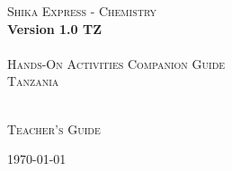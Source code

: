 \begin{titlepage}

\begin{center}
	\textsc{{\Huge Shika Express - Chemistry}}\\[0.4cm]
	\textbf{{\huge Version 1.0 TZ}}\\[1.5cm]
	\HRule\\[0.4cm]
	\textsc{{\Large Hands-On Activities Companion Guide}}\\[0.4cm]
	\textsc{{\Large Tanzania}}\\[0.4cm]
	\HRule\\[0.5cm]
\end{center}

\vfill
\begin{center}
\textsc{{\Large Teacher's Guide}}\\[0.4cm]
\end{center}

\begin{center}
	{\large \today}
\end{center}

\end{titlepage}
